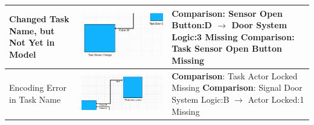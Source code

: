 \begin{longtable}{p{} >{\raggedright\arraybackslash}m{} >{\raggedright\arraybackslash}m{}}
    \midrule
    Changed Task Name, but Not Yet in Model & \includegraphics[width=\linewidth]{pictures/91_modified_task_name_input_clip.png} & \textbf{Comparison}: Sensor Open Button:D $\rightarrow$ Door System Logic:3 Missing \newline \textbf{Comparison}: Task Sensor Open Button Missing \\
    \midrule
    Encoding Error in Task Name & \includegraphics[width=\linewidth]{pictures/90_encoding_error_input_clip.png} & \textbf{Comparison}: Task Actor Locked Missing \newline \textbf{Comparison}: Signal Door System Logic:B $\rightarrow$ Actor Locked:1 Missing \\
\end{longtable}


